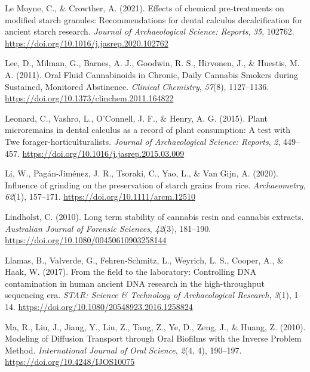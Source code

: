 \documentclass[
  letterpaper,
]{book}
\newlength{\cslhangindent}
\newlength{\cslentryspacingunit} %
\newenvironment{CSLReferences}[2] %
 {%
  \setlength{\parindent}{0pt}
  \ifodd #1
  \let\oldpar\par
  \def\par{\hangindent=\cslhangindent\oldpar}
  \fi
  \setlength{\parskip}{#2\cslentryspacingunit}
 }%
 {}
\begin{document}
\begin{CSLReferences}{1}{0}
\leavevmode{}%
Le Moyne, C., \& Crowther, A. (2021). Effects of chemical pre-treatments
on modified starch granules: {Recommendations} for dental calculus
decalcification for ancient starch research. \emph{Journal of
Archaeological Science: Reports}, \emph{35}, 102762.
\url{https://doi.org/10.1016/j.jasrep.2020.102762}

\leavevmode{}%
Lee, D., Milman, G., Barnes, A. J., Goodwin, R. S., Hirvonen, J., \&
Huestis, M. A. (2011). Oral {Fluid Cannabinoids} in {Chronic}, {Daily
Cannabis Smokers} during {Sustained}, {Monitored Abstinence}.
\emph{Clinical Chemistry}, \emph{57}(8), 1127--1136.
\url{https://doi.org/10.1373/clinchem.2011.164822}

\leavevmode{}%
Leonard, C., Vashro, L., O'Connell, J. F., \& Henry, A. G. (2015). Plant
microremains in dental calculus as a record of plant consumption: {A}
test with {Twe} forager-horticulturalists. \emph{Journal of
Archaeological Science: Reports}, \emph{2}, 449--457.
\url{https://doi.org/10.1016/j.jasrep.2015.03.009}

\leavevmode{}%
Li, W., Pagán-Jiménez, J. R., Tsoraki, C., Yao, L., \& Van Gijn, A.
(2020). Influence of grinding on the preservation of starch grains from
rice. \emph{Archaeometry}, \emph{62}(1), 157--171.
\url{https://doi.org/10.1111/arcm.12510}

\leavevmode{}%
Lindholst, C. (2010). Long term stability of cannabis resin and cannabis
extracts. \emph{Australian Journal of Forensic Sciences}, \emph{42}(3),
181--190. \url{https://doi.org/10.1080/00450610903258144}

\leavevmode{}%
Llamas, B., Valverde, G., Fehren-Schmitz, L., Weyrich, L. S., Cooper,
A., \& Haak, W. (2017). From the field to the laboratory: {Controlling
DNA} contamination in human ancient {DNA} research in the
high-throughput sequencing era. \emph{STAR: Science \& Technology of
Archaeological Research}, \emph{3}(1), 1--14.
\url{https://doi.org/10.1080/20548923.2016.1258824}

\leavevmode{}%
Ma, R., Liu, J., Jiang, Y., Liu, Z., Tang, Z., Ye, D., Zeng, J., \&
Huang, Z. (2010). Modeling of {Diffusion Transport} through {Oral
Biofilms} with the {Inverse Problem Method}. \emph{International Journal
of Oral Science}, \emph{2}(4, 4), 190--197.
\url{https://doi.org/10.4248/IJOS10075}


\end{CSLReferences}
\end{document}
